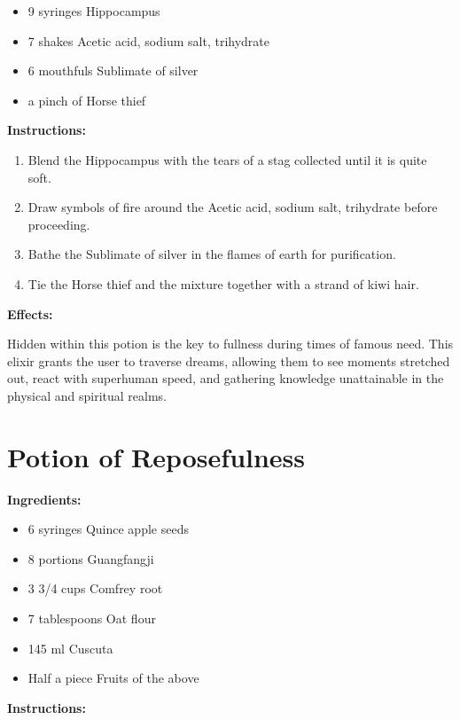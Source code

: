 \documentclass{article}
\begin{document}
\begin{itemize}
  \item 9 syringes Hippocampus
  \item 7 shakes Acetic acid, sodium salt, trihydrate
  \item 6 mouthfuls Sublimate of silver
  \item a pinch of Horse thief
\end{itemize}

\textbf{Instructions:}

\begin{enumerate}
  \item Blend the Hippocampus with the tears of a stag collected until it is quite soft.
  \item Draw symbols of fire around the Acetic acid, sodium salt, trihydrate before proceeding.
  \item Bathe the Sublimate of silver in the flames of earth for purification.
  \item Tie the Horse thief and the mixture together with a strand of kiwi hair.
\end{enumerate}

\textbf{Effects:}

Hidden within this potion is the key to fullness during times of famous need. This elixir grants the user to traverse dreams, allowing them to see moments stretched out, react with superhuman speed, and gathering knowledge unattainable in the physical and spiritual realms.

\newpage
\section*{Potion of Reposefulness}

\textbf{Ingredients:}

\begin{itemize}
  \item 6 syringes Quince apple seeds
  \item 8 portions Guangfangji
  \item 3 3/4 cups Comfrey root
  \item 7 tablespoons Oat flour
  \item 145 ml Cuscuta
  \item Half a piece Fruits of the above
\end{itemize}

\textbf{Instructions:}
\end{document}
